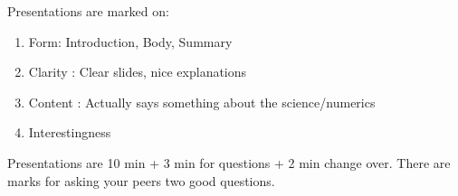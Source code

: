 \documentclass[12pt]{article}
\begin{document}
Presentations are marked on:
\begin{enumerate}
\item Form: Introduction, Body, Summary
\item Clarity : Clear slides, nice explanations
\item Content : Actually says something about the science/numerics
\item Interestingness
\end{enumerate}

Presentations are 10 min + 3 min for questions + 2 min change over. There are marks for asking your peers two good questions.
\end{document}
